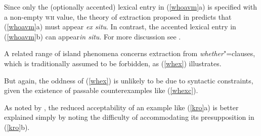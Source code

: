 \documentclass[output=paper,biblatex,babelshorthands,newtxmath,draftmode,colorlinks,citecolor=brown]{langscibook}
\begin{document}
\zl

Since only the (optionally accented) lexical entry in (\ref{whoavm}a) is specified with a non-empty
\textsc{wh} value, the theory of extraction proposed in \citet[Chapter~5]{ginzsag} predicts that (\ref{whoavm}a)
must appear \emph{ex situ}.  In contrast, the accented lexical entry in (\ref{whoavm}b) can
appear\emph{in situ}. For more discussion see \citet[261]{levhubook}.

A related range of island phenomena concerns extraction from \emph{whether}"=clauses, which is
traditionally assumed to be forbidden, as (\ref{whex}) illustrates.

\eal \label{whex}
\zl 

\noindent
But again, the oddness of (\ref{whex}) is unlikely to be due to syntactic constraints, given the
existence of passable counterexamples like (\ref{whexc}).

\eal \label{whexc}
\zl

As noted by \citet[28]{Kroch98a}, the reduced acceptability of an example like (\ref{kro}a) is better
explained simply by noting the difficulty of accommodating its presupposition in (\ref{kro}b).
\end{document}
